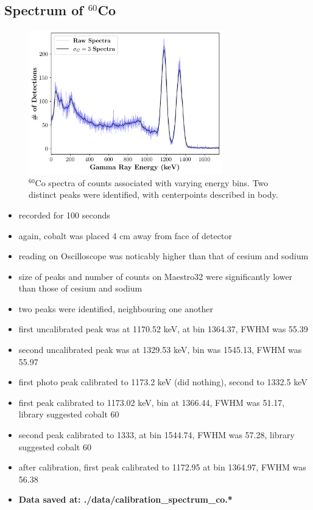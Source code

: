 \documentclass[a4paper]{article}
\begin{document}
\subsection{Spectrum of $^{60}$Co}
\begin{figure}[H]
    \centering
    \includegraphics[width=0.75\textwidth]{figures/calibration_spectrum_co_counts_overlay_final_mca.png}
    \caption{$^{60}$Co spectra of counts associated with varying energy bins. Two distinct peaks were identified, with centerpoints described in body.}
\end{figure}
\begin{itemize}
    \item recorded for 100 seconds
    \item again, cobalt was placed 4 cm away from face of detector
    \item reading on Oscilloscope was noticably higher than that of cesium and sodium
    \item size of peaks and number of counts on Maestro32 were significantly lower than those of cesium and sodium
    \item two peaks were identified, neighbouring one another
    \item first uncalibrated peak was at 1170.52 keV, at bin 1364.37, FWHM was 55.39
    \item second uncalibrated peak was at 1329.53 keV, bin was 1545.13, FWHM was 55.97
    \item first photo peak calibrated to 1173.2 keV (did nothing), second to 1332.5 keV
    \item first peak calibrated to 1173.02 keV, bin at 1366.44, FWHM was 51.17, library suggested cobalt 60
    \item second peak calibrated to 1333, at bin 1544.74, FWHM was 57.28, library suggested cobalt 60
    \item after calibration, first peak calibrated to 1172.95 at bin 1364.97, FWHM was 56.38
    \item \textbf{Data saved at: ./data/calibration\_spectrum\_co.*}
\end{itemize}
\end{document}
